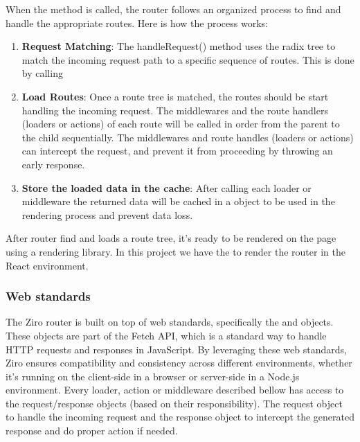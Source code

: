 When the  method is called, the router follows an organized process to find and handle the appropriate routes. Here is how the process works:

\begin{enumerate}
  \item \textbf{Request Matching}: The handleRequest() method uses the radix tree to match the incoming request path to a specific sequence of routes. This is done by calling 

  \item \textbf{Load Routes}: Once a route tree is matched, the routes should be start handling the incoming request. The middlewares and the route handlers (loaders or actions) of each route will be called in order from the parent to the child sequentially. The middlewares and route handles (loaders or actions) can intercept the request, and prevent it from proceeding by throwing an early response.

  \item \textbf{Store the loaded data in the cache}: After calling each loader or middleware the returned data will be cached in a  object to be used in the rendering process and prevent data loss.

\end{enumerate}

After router find and loads a route tree, it's ready to be rendered on the page using a rendering library. In this project we have the  to render the router in the React environment.


\subsubsection{Web standards}

The Ziro router is built on top of web standards, specifically the  and  objects. These objects are part of the Fetch API, which is a standard way to handle HTTP requests and responses in JavaScript. By leveraging these web standards, Ziro ensures compatibility and consistency across different environments, whether it's running on the client-side in a browser or server-side in a Node.js environment. Every loader, action or middleware described bellow has access to the request/response objects (based on their responsibility). The request object to handle the incoming request and the response object to intercept the generated response and do proper action if needed.


